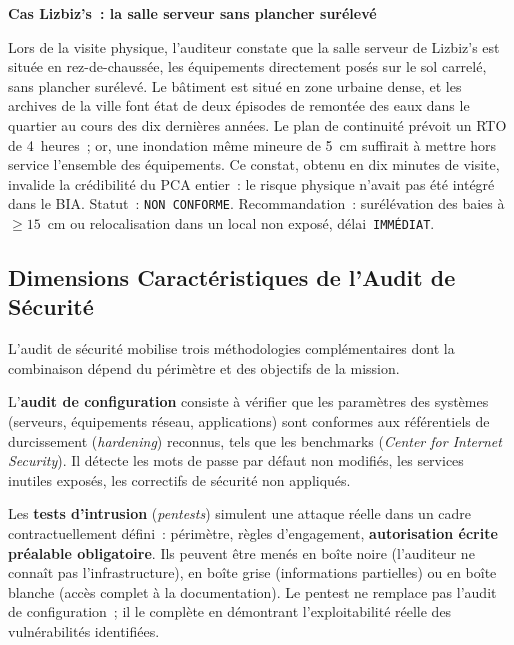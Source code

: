 \begin{boxlizbiz}
\textbf{Cas Lizbiz's~: la salle serveur sans plancher surélevé}

Lors de la visite physique, l'auditeur constate que la salle serveur de Lizbiz's
est située en rez-de-chaussée, les équipements directement posés sur le sol carrelé,
sans plancher surélevé. Le bâtiment est situé en zone urbaine dense, et les archives
de la ville font état de deux épisodes de remontée des eaux dans le quartier au cours
des dix dernières années. Le plan de continuité prévoit un RTO de 4~heures~; or,
une inondation même mineure de 5~cm suffirait à mettre hors service l'ensemble des
équipements. Ce constat, obtenu en dix minutes de visite, invalide la crédibilité du
PCA entier~: le risque physique n'avait pas été intégré dans le BIA.
Statut~: \texttt{NON~CONFORME}. Recommandation~: surélévation des baies à $\geq
15$~cm ou relocalisation dans un local non exposé, délai~\texttt{IMMÉDIAT}.
\end{boxlizbiz}

\subsection{Dimensions Caractéristiques de l'Audit de Sécurité}
\label{subsec:securite-dimensions}

L'audit de sécurité mobilise trois méthodologies complémentaires dont la combinaison
dépend du périmètre et des objectifs de la mission.

L'\textbf{audit de configuration} consiste à vérifier que les paramètres des systèmes
(serveurs, équipements réseau, applications) sont conformes aux référentiels de
durcissement (\textit{hardening}) reconnus, tels que les benchmarks 
(\textit{Center for Internet Security}). Il détecte les mots de passe par défaut
non modifiés, les services inutiles exposés, les correctifs de sécurité non appliqués.

Les \textbf{tests d'intrusion} (\textit{pentests}) simulent une attaque réelle dans un
cadre contractuellement défini~: périmètre, règles d'engagement, \textbf{autorisation
écrite préalable obligatoire}. Ils peuvent être menés en boîte noire (l'auditeur ne
connaît pas l'infrastructure), en boîte grise (informations partielles) ou en boîte
blanche (accès complet à la documentation). Le pentest ne remplace pas l'audit de
configuration~; il le complète en démontrant l'exploitabilité réelle des vulnérabilités
identifiées.


